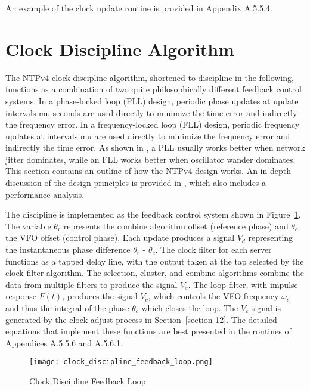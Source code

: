 An example of the clock update routine is provided in
Appendix A.5.5.4.

\section{Clock Discipline Algorithm}
\label{section-11-3}

The NTPv4 clock discipline algorithm, shortened to discipline in the
following, functions as a combination of two quite philosophically
different feedback control systems. In a phase-locked loop (PLL)
design, periodic phase updates at update intervals mu seconds are
used directly to minimize the time error and indirectly the frequency
error. In a frequency-locked loop (FLL) design, periodic frequency
updates at intervals mu are used directly to minimize the frequency
error and indirectly the time error. As shown in \cite{ref7}, a PLL
usually works better when network jitter dominates, while an FLL
works better when oscillator wander dominates. This section contains
an outline of how the NTPv4 design works. An in-depth discussion of
the design principles is provided in \cite{ref7}, which also includes a
performance analysis.

The discipline is implemented as the feedback control system shown in
Figure~\ref{clock_discipline_feedback_loop}. The variable $ \theta_r $ represents the combine algorithm
offset (reference phase) and $ \theta_c $ the VFO offset (control phase).
Each update produces a signal $ V_d $ representing the instantaneous
phase difference $ \theta_r $ - $ \theta_c $. The clock filter for each server
functions as a tapped delay line, with the output taken at the tap
selected by the clock filter algorithm. The selection, cluster, and
combine algorithms combine the data from multiple filters to produce
the signal $ V_s $. The loop filter, with impulse response $ F(t) $,
produces the signal $ V_c $, which controls the VFO frequency $ \omega_c $ and
thus the integral of the phase $ \theta_c $ which closes the loop. The
$ V_c $ signal is generated by the clock-adjust process in Section~\ref{section-12}.
The detailed equations that implement these functions are best
presented in the routines of Appendices A.5.5.6 and A.5.6.1.

\begin{figure}
\centering
\texttt{[image: clock\_discipline\_feedback\_loop.png]}
\caption{Clock Discipline Feedback Loop}
\label{clock_discipline_feedback_loop}
\end{figure}

